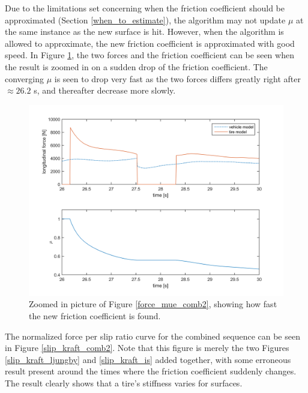 Due to the limitations set concerning when the friction coefficient should be approximated (Section \ref{when_to_estimate}), the algorithm may not update $ \mu $ at the same instance as the new surface is hit. However, when the algorithm is allowed to approximate, the new friction coefficient is approximated with good speed. In Figure \ref{force_mue_comb2_zoom}, the two forces and the friction coefficient can be seen when the result is zoomed in on a sudden drop of the friction coefficient. The converging $ \mu $ is seen to drop very fast as the two forces differs greatly right after $ \approx 26.2 $ s, and thereafter decrease more slowly. 

\begin{figure}[h]
	\centering
	\includegraphics[width=1.0\textwidth]{Pictures/force_mue_comb2_zoom}
	\caption {Zoomed in picture of Figure \ref{force_mue_comb2}, showing how fast the new friction coefficient is found.}
	\label{force_mue_comb2_zoom}
\end{figure}

The normalized force per slip ratio curve for the combined sequence can be seen in Figure \ref{slip_kraft_comb2}. Note that this figure is merely the two Figures \ref{slip_kraft_ljungby} and \ref{slip_kraft_is} added together, with some erroneous result present around the times where the friction coefficient suddenly changes. The result clearly shows that a tire's stiffness varies for surfaces.

